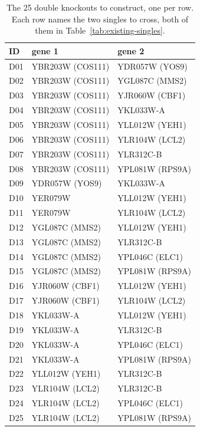 \begin{table}[H]\centering
\footnotesize
\caption[]{The 25 double knockouts to construct, one per row. Each row names the two singles to cross, both of them in Table~\ref{tab:existing-singles}.}\label{tab:new-doubles}
\begin{tabular}{lll}
\toprule
ID & gene 1 & gene 2 \\
\midrule
D01 & YBR203W (COS111) & YDR057W (YOS9) \\
D02 & YBR203W (COS111) & YGL087C (MMS2) \\
D03 & YBR203W (COS111) & YJR060W (CBF1) \\
D04 & YBR203W (COS111) & YKL033W-A \\
D05 & YBR203W (COS111) & YLL012W (YEH1) \\
D06 & YBR203W (COS111) & YLR104W (LCL2) \\
D07 & YBR203W (COS111) & YLR312C-B \\
D08 & YBR203W (COS111) & YPL081W (RPS9A) \\
D09 & YDR057W (YOS9) & YKL033W-A \\
D10 & YER079W & YLL012W (YEH1) \\
D11 & YER079W & YLR104W (LCL2) \\
D12 & YGL087C (MMS2) & YLL012W (YEH1) \\
D13 & YGL087C (MMS2) & YLR312C-B \\
D14 & YGL087C (MMS2) & YPL046C (ELC1) \\
D15 & YGL087C (MMS2) & YPL081W (RPS9A) \\
D16 & YJR060W (CBF1) & YLL012W (YEH1) \\
D17 & YJR060W (CBF1) & YLR104W (LCL2) \\
D18 & YKL033W-A & YLL012W (YEH1) \\
D19 & YKL033W-A & YLR312C-B \\
D20 & YKL033W-A & YPL046C (ELC1) \\
D21 & YKL033W-A & YPL081W (RPS9A) \\
D22 & YLL012W (YEH1) & YLR312C-B \\
D23 & YLR104W (LCL2) & YLR312C-B \\
D24 & YLR104W (LCL2) & YPL046C (ELC1) \\
D25 & YLR104W (LCL2) & YPL081W (RPS9A) \\
\bottomrule
\end{tabular}
\end{table}
